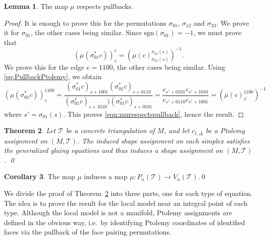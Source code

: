 \documentclass[12pt]{amsart}
\newtheorem{theorem}{Theorem}[section]
\theoremstyle{definition}
\newtheorem{lemma}[theorem]{Lemma}
\newtheorem{remark}[theorem]{Remark}
\newtheorem{corollary}[theorem]{Corollary}
\numberwithin{equation}{section}
\def\sgn{\mathrm{sgn}}
\def\T{\mathcal{T}}
\begin{document}
\begin{lemma}\label{lemma:ReorderCompatibility}
The map $\mu$ respects pullbacks.
\end{lemma}
\begin{proof}
It is enough to prove this for the permutations $\sigma_{01}$, $\sigma_{12}$ and $\sigma_{23}$. We prove it for $\sigma_{01}$, the other cases being similar. Since $\sgn(\sigma_{01})=-1$, we must prove that 
\begin{equation}\label{eqn:murespectspullback}(\mu(\sigma_{01}^*c))^e_s=(\mu(c)_{\sigma_{01}(s)}^{\sigma_{01}(e)})^{-1}.\end{equation}
We prove this for the edge $e=1100$, the other cases being similar. Using \eqref{eq:PullbackPtolemy}, we obtain
\begin{equation}
(\mu(\sigma_{01}^*c))^{1100}_s=\frac{(\sigma_{01}^*c)_{s+1001}(\sigma_{01}^*c)_{s+0110}}{(\sigma_{01}^*c)_{s+1010})(\sigma_{01}^*c)_{s+0101}}=\frac{c_{s'+0101}c_{s'+1010}}{c_{s'+0110}c_{s'+1001}}=(\mu(c)_{s'}^{1100})^{-1}
\end{equation}
where $s'=\sigma_{01}(s)$. This proves \eqref{eqn:murespectspullback}, hence the result.
\end{proof}



\begin{theorem}\label{thm:PtolemyYieldsShapes}
Let $\mathcal{T}$ be a concrete triangulation of $M$, and let $c_{t,\Delta}$ be a Ptolemy assignment on $(M,\mathcal{T})$. The induced shape assignment on each simplex satisfies the generalized gluing equations and thus induces a shape assignment on $(M,\mathcal{T})$. \qed
\end{theorem}

\begin{corollary} The map $\mu$ induces a map $\mu\colon P_n(\T)\to V_n(\T)$.\qed
\end{corollary}


We divide the proof of Theorem~\ref{thm:PtolemyYieldsShapes} into three parts, one for each type of equation. The idea is to prove the result for the local model near an integral point of each type. Although the local model is not a manifold, Ptolemy assignments are defined in the obvious way, i.e.~by identifying Ptolemy coordinates of identified faces via the pullback of the face pairing permutations.
\end{document}
